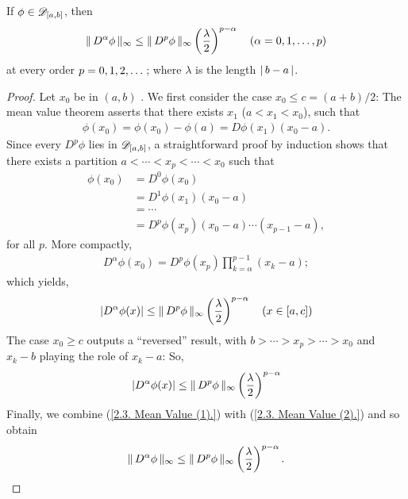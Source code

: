 If 
%
  $\phi\in{\mathscr D}_{[a, b]}$, then %
%
%
  \begin{align}\label{2.3. Mean value inequality.}
    \| \,D^\alpha \phi \, \|_{\infty} 
      \leq 
    \| \,D^p \phi \, \|_{\infty} \left(\frac{\lambda}{2}\right)^{p-\alpha}
      \quad (\alpha = 0, 1, \dots, p) 
  \end{align}
%
at every order $p=0, 1, 2, \dots$; %
where $\lambda$ is the length $\left\lvert\, b-a \,\right\rvert$. %
%
\begin{proof}
Let $x_0$ be in %
% 
    $(a, b)$ .
% 
We first consider the case $x_0 \leq c = (a+b)/2$: %
The mean value theorem asserts that there exists %
%
  $x_{1}$ ($a <x_{1} < x_{0} $), 
%
such that 
%
  \begin{align}
    \phi(x_0) =\phi(x_0) - \phi(a)=  D\phi(x_{1})(x_{0} -a).
  \end{align}
%
Since every %
%
  $D^p\phi$ lies in ${\mathscr D}_{[a, b]}$, %
%
a straightforward proof by induction shows that there exists a partition %
%
  $a < \cdots < x_p < \cdots < x_0 $ 
%
such that 
  \begin{align}
    \phi(x_0) & = D^0 \phi(x_0) \\ 
              & = D^1\phi(x_{1})(x_{0} - a ) \\
              & = \cdots \nonumber\\
              & = D^p\phi(x_{p})(x_{0} - a)\cdots(x_{p-1}-a),
  \end{align}
%
for all $p$. %
More compactly, 
%
  \begin{align}
      D^\alpha \phi (x_0) = D^p\phi(x_p) \prod_{k= \alpha}^{p-1}(x_k - a);
  \end{align}
%
which yields, 
%
  \begin{align}\label{2.3. Mean Value (1).}
    \lvert D^\alpha \phi(x) \rvert
      \leq 
    \| \,D^p \phi \, \|_{\infty} 
    \left(\frac{\lambda}{2}\right)^{p-\alpha}
    \quad (x \in [a, c])
  \end{align}
%
The case $x_0 \geq c$ outputs a ``reversed'' result, with %
%
  $b > \cdots > x_p > \cdots > x_0$ %
%
and $x_k -b$ playing the role of $x_k-a$: %
So, %
%
  \begin{align}\label{2.3. Mean Value (2).}
    \lvert D^\alpha \phi(x) \rvert
      \leq 
    \| \,D^p \phi \, \|_{\infty} 
    \left(\frac{\lambda}{2}\right)^{p-\alpha} 
  \end{align}
%
Finally, we combine %
%
  (\ref{2.3. Mean Value (1).}) with %
  (\ref{2.3. Mean Value (2).}) %
%
and so obtain %
%
  \begin{align}
    \| \,D^\alpha \phi \, \|_{\infty} 
      \leq 
    \| \,D^p \phi \, \|_{\infty} 
    \left(\frac{\lambda}{2}\right)^{p-\alpha}.
  \end{align}
%
\end{proof}